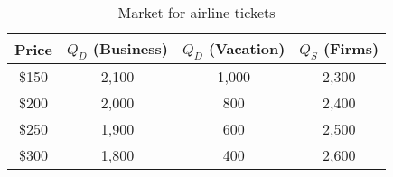\begin{table}
  \centering
    \begin{tabular}{|c|c|c|c|}
      \hline
      \textbf{Price} & \textbf{$Q_D$ (Business)} & \textbf{$Q_D$ (Vacation)} & \textbf{$Q_S$ (Firms)} \\
      \hline
      \$150 & 2,100 & 1,000 & 2,300 \\
      \hline
      \$200 & 2,000 & 800   & 2,400 \\
      \hline
      \$250 & 1,900 & 600   & 2,500 \\
      \hline
      \$300 & 1,800 & 400   & 2,600 \\
      \hline
    \end{tabular}
    \caption{Market for airline tickets}
  \end{table}